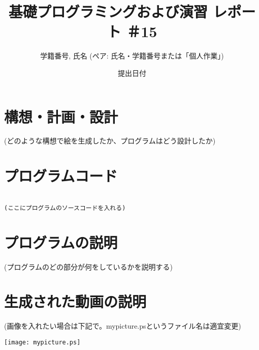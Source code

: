 \documentclass[12pt,a4j]{jarticle}
\begin{document}
\title{基礎プログラミングおよび演習 レポート ＃15}

\author{学籍番号, 氏名 (ペア: 氏名・学籍番号または「個人作業」)}

\date{提出日付}

\maketitle



\section{構想・計画・設計}



(どのような構想で絵を生成したか、プログラムはどう設計したか)



\section{プログラムコード}



\begin{verbatim}

(ここにプログラムのソースコードを入れる)

\end{verbatim}



\section{プログラムの説明}



(プログラムのどの部分が何をしているかを説明する)



\section{生成された動画の説明}



(画像を入れたい場合は下記で。mypicture.psというファイル名は適宜変更)

\begin{center}

\texttt{[image: mypicture.ps]}

\end{center}
\end{document}
